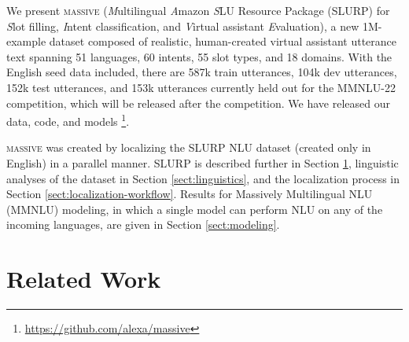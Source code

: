 \documentclass[11pt]{article}
\newif\ifreview
\newcommand{\M}{\textsc{massive}}
\begin{document}
\ifreview
We present \M{} (\textit{M}ultilingual [redacted] \textit{S}LU Resource Package (SLURP) for \textit{S}lot filling, \textit{I}ntent classification, and \textit{V}irtual assistant \textit{E}valuation), a new 1M-example dataset composed of realistic, human-created virtual assistant utterance text spanning 51 languages, 60 intents, 55 slot types, and 18 domains.
With the English seed data included, there are 587k train utterances, 104k dev utterances, 152k test utterances, and 153k utterances currently held out for the [redacted] competition, which will be released after the competition.
We have released our data, code, and models \footnote{link to github repo}.
\else
We present \M{} (\textit{M}ultilingual \textit{A}mazon \textit{S}LU Resource Package (SLURP) for \textit{S}lot filling, \textit{I}ntent classification, and \textit{V}irtual assistant \textit{E}valuation), a new 1M-example dataset composed of realistic, human-created virtual assistant utterance text spanning 51 languages, 60 intents, 55 slot types, and 18 domains.
With the English seed data included, there are 587k train utterances, 104k dev utterances, 152k test utterances, and 153k utterances currently held out for the MMNLU-22 competition, which will be released after the competition.
We have released our data, code, and models \footnote{\href{https://github.com/alexa/massive}{https://github.com/alexa/massive}}.
\fi

\M{} was created by localizing the SLURP NLU dataset (created only in English) in a parallel manner. SLURP is described further in Section \ref{sect:related}, linguistic analyses of the dataset in Section \ref{sect:linguistics}, and the localization process in Section \ref{sect:localization-workflow}. Results for Massively Multilingual NLU (MMNLU) modeling, in which a single model can perform NLU on any of the incoming languages, are given in Section \ref{sect:modeling}.

\section{Related Work} \label{sect:related}
\end{document}
